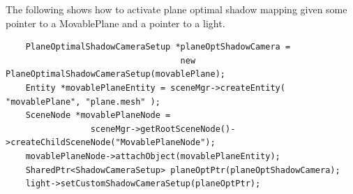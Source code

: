 \documentclass[]{article}  %
\begin{document}
The following shows how to activate plane optimal shadow mapping given some pointer to a MovablePlane and a pointer to a light.  

\begin{verbatim}
	PlaneOptimalShadowCameraSetup *planeOptShadowCamera = 
	                               new PlaneOptimalShadowCameraSetup(movablePlane);
	Entity *movablePlaneEntity = sceneMgr->createEntity( "movablePlane", "plane.mesh" );
	SceneNode *movablePlaneNode = 
	             sceneMgr->getRootSceneNode()->createChildSceneNode("MovablePlaneNode");
	movablePlaneNode->attachObject(movablePlaneEntity);
	SharedPtr<ShadowCameraSetup> planeOptPtr(planeOptShadowCamera);
	light->setCustomShadowCameraSetup(planeOptPtr);
\end{verbatim}



\end{document}
